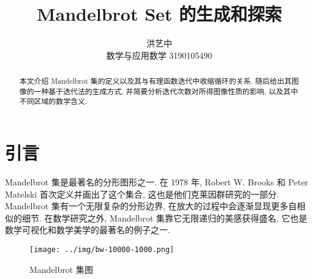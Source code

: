 \documentclass{ctexart}
\title{Mandelbrot Set 的生成和探索}
\author{洪艺中 \\ 数学与应用数学 3190105490}
\begin{document}
\maketitle

\begin{abstract}
本文介绍 Mandelbrot 集的定义以及其与有理函数迭代中收缩循环的关系. 随后给出其图像的一种基于迭代法的生成方式, 并简要分析迭代次数对所得图像性质的影响, 以及其中不同区域的数学含义.
\end{abstract}
\section{引言} %
\label{sec:引言}
Mandelbrot 集是最著名的分形图形之一. 在 1978 年, Robert W. Brooks 和 Peter Matelski 首次定义并画出了这个集合, 这也是他们克莱因群研究的一部分. Mandelbrot 集有一个无限复杂的分形边界, 在放大的过程中会逐渐显现更多自相似的细节. 在数学研究之外, Mandelbrot 集靠它无限递归的美感获得盛名, 它也是数学可视化和数学美学的最著名的例子之一\cite{wiki-Madelbrot_set}. \par
\begin{figure}[htbp]
	\centering
	\texttt{[image: ../img/bw-10000-1000.png]}
	\caption{Mandelbrot 集图}
	\label{fig::intro}
\end{figure}
\end{document}
